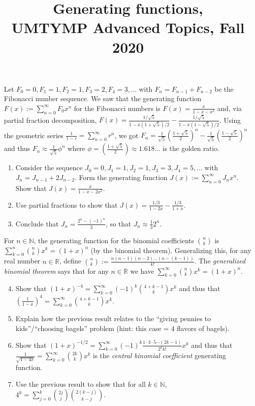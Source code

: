 \documentclass[11pt]{article}
\title{Generating functions, \\UMTYMP Advanced Topics, Fall 2020}
\date{}
\begin{document}
\maketitle

\thispagestyle{empty}

\vspace{-0.5cm}

Let $F_0=0,F_1=1,F_2=1,F_3=2,F_4=3,...$ with $F_{n} = F_{n-1} + F_{n-2}$ be the Fibonacci number sequence. We saw that the generating function $F(x) := \sum_{n=0}^{\infty}F_0 x^n$ for the Fibonacci numbers is $F(x) = \frac{x}{1-x-x^2}$ and, via partial fraction decomposition, $F(x) = \frac{ 1/\sqrt{5}}{1- x(1+\sqrt{5})/2} - \frac{ 1/\sqrt{5}}{1- x(1-\sqrt{5})/2}$. Using the geometric series $\frac{1}{1-r}= \sum_{n=0}^{\infty}r^n$, we got $F_n = \frac{1}{\sqrt{5}}(\frac{1+\sqrt{5}}{2})^n - \frac{1}{\sqrt{5}}(\frac{1-\sqrt{5}}{2})^n$ and thus $F_n \approx \frac{1}{\sqrt{5}}\phi^n$ where $\phi =(\frac{1+\sqrt{5}}{2})\approx 1.618...$ is the golden ratio.

\begin{enumerate}
\item Consider the sequence $J_0=0, J_1=1, J_2=1, J_3=3, J_4=5, ...$ with $J_{n}=J_{n-1}+2J_{n-2}$. Form the generating function $J(x) := \sum_{n=0}^{\infty} J_n x^n$. Show that $J(x) = \frac{x}{1-x-2x^2}$.
\item Use partial fractions to show that $J(x) = \frac{1/3}{1-2x} - \frac{1/3}{1+x}$.
\item Conclude that $J_n = \frac{2^n-(-1)^n}{3}$, so that $J_n \approx \frac{1}{3}2^n$.
\end{enumerate}

For $n \in \mathbb{N}$, the generating function for the binomial coefficients $\binom{n}{k}$ is $\sum_{k=0}^{n} \binom{n}{k} x^k = (1+x)^n$ (by the binomial theorem). Generalizing this, for any real number $n \in \mathbb{R}$, define $\binom{n}{k} := \frac{n(n-1)(n-2)...(n-(k-1))}{k!}$. The \emph{generalized binomial theorem} says that for any $n \in \mathbb{R}$ we have $\sum_{k=0}^{\infty} \binom{n}{k} x^k = (1+x)^n$.



\begin{enumerate}
\setcounter{enumi}{3}
\item Show that $(1+x)^{-4} = \sum_{k=0}^{\infty} (-1)^k \binom{4+k-1}{k} x^k$ and thus that $\left(\frac{1}{1-x}\right)^4 = \sum_{k=0}^{\infty} \binom{4+k-1}{k} x^k$. 

\item Explain how the previous result relates to the ``giving pennies to kids''/``choosing bagels'' problem (hint: this case = 4 flavors of bagels).

\item Show that $(1+x)^{-1/2} = \sum_{k=0}^{\infty}(-1)^k \frac{1 \cdot 3 \cdot 5 \cdots (2k-1)}{2^k k!} x^k$ and thus that $\frac{1}{\sqrt{1-4x}} =  \sum_{k=0}^{\infty} \binom{2k}{k}x^k$ is the \emph{central binomial coefficient} generating function.

\item Use the previous result to show that for all $k \in \mathbb{N}$, $4^k = \sum_{j=0}^{k} \binom{2j}{j} \binom{2(k-j)}{k-j}$.

\end{enumerate}
\end{document}

